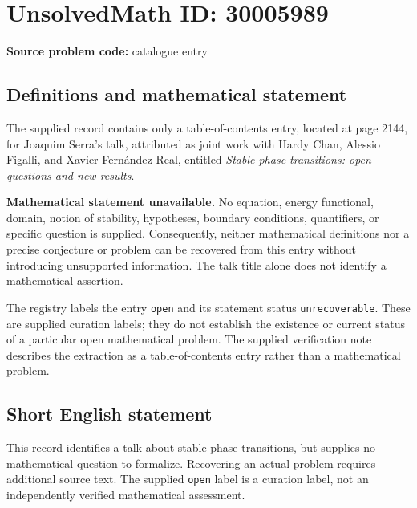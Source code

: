 \documentclass[11pt]{article}
\begin{document}
\section*{UnsolvedMath ID: 30005989}
\textbf{Source problem code:} catalogue entry
\subsection{Definitions and mathematical statement}
The supplied record contains only a table-of-contents entry, located at page 2144, for Joaquim Serra's talk, attributed as joint work with Hardy Chan, Alessio Figalli, and Xavier Fern\'andez-Real, entitled \emph{Stable phase transitions: open questions and new results}.

\textbf{Mathematical statement unavailable.} No equation, energy functional, domain, notion of stability, hypotheses, boundary conditions, quantifiers, or specific question is supplied. Consequently, neither mathematical definitions nor a precise conjecture or problem can be recovered from this entry without introducing unsupported information. The talk title alone does not identify a mathematical assertion.

The registry labels the entry \texttt{open} and its statement status \texttt{unrecoverable}. These are supplied curation labels; they do not establish the existence or current status of a particular open mathematical problem. The supplied verification note describes the extraction as a table-of-contents entry rather than a mathematical problem.
\subsection{Short English statement}
This record identifies a talk about stable phase transitions, but supplies no mathematical question to formalize. Recovering an actual problem requires additional source text. The supplied \texttt{open} label is a curation label, not an independently verified mathematical assessment.
\end{document}
